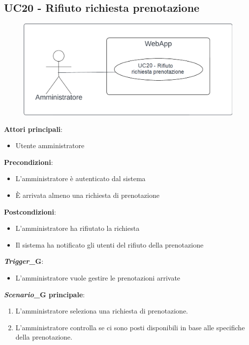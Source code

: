 \subsection{UC20 - Rifiuto richiesta prenotazione}\label{usecase:20}
\begin{figure}[H]
    \centering
    \includegraphics[width=0.9\linewidth]{ucd/ucd20.png}
\end{figure}
\textbf{Attori principali}:
\begin{itemize}
    \item Utente amministratore
\end{itemize}
\textbf{Precondizioni}:
\begin{itemize}
    \item L'amministratore è autenticato dal sistema
    \item \`E arrivata almeno una richiesta di prenotazione
\end{itemize}
\textbf{Postcondizioni}:
\begin{itemize}
    \item L'amministratore ha rifiutato la richiesta
    \item Il sistema ha notificato gli utenti del rifiuto della prenotazione
\end{itemize}
\textbf{\textit{Trigger}_G}:
\begin{itemize}
    \item L'amministratore vuole gestire le prenotazioni arrivate
\end{itemize}
\textbf{\textit{Scenario}_G principale}:
\begin{enumerate}
    \item L'amministratore seleziona una richiesta di prenotazione.
    \item L'amministratore controlla se ci sono posti disponibili in base alle specifiche della prenotazione.
\end{enumerate}
\newpage

